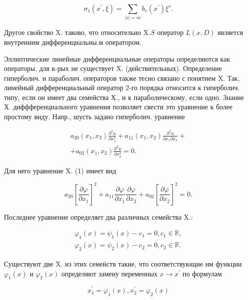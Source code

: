 \documentclass[10pt]{article}
\begin{document}
\[

\sigma_{1}\left(x^{\prime}, \xi\right)=\sum_{|v|=m} b_{v}\left(x^{\prime}\right) \xi^{v} .

\]



Другое свойство X. таково, что относительно $\mathrm{X} . S$ оператор $L(x, D)$ является внутренним дифференциальны.м оператором.



Эллиптические линейные дифференциальные операторы определяются как операторы, для к-рых не существует X. (действительных). Определение гиперболич. и параболич. операторов также тесно связано с понятием X. Так, линейный дифференциальный оператор 2-го порядка относится к гиперболич. типу, если он имеет два семейства Х., и к параболическому, если одно. Знание Х. диффференциального уравнения позволяет свести это уравнение к более простому виду. Напр., шусть задано гиперболич. уравнение



\[

\begin{gathered}

a_{20}\left(x_{1}, x_{2}\right) \frac{\partial^{2} u}{\partial x_{1}^{2}}+a_{11}\left(x_{1}, x_{2}\right) \frac{\partial^{2} u}{\partial x_{1} \partial x_{2}}+ \\

+a_{02}\left(x_{1}, x_{2}\right) \frac{\partial^{2} u}{\partial x_{2}^{2}}=0 .

\end{gathered}

\]



Для него уравнение X. (1) имеет вид



\[

a_{20}\left[\frac{\partial \varphi}{\partial x_{1}}\right]^{2}+a_{11} \frac{\partial \varphi}{\partial x_{1}} \frac{\partial \varphi}{\partial x_{2}}+a_{02}\left[\frac{\partial \varphi}{\partial x_{2}}\right]^{2}=0 .

\]



Последнее уравнение определяет два различных семейства X.:



\[

\begin{gathered}

\varphi_{1}(x)=\psi_{1}(x)-c_{1}=0, c_{1} \in \mathbb{R}, \\

\varphi_{2}(x)=\psi_{2}(x)-c_{2}=0, c_{2} \in \mathbb{R} .

\end{gathered}

\]



Существуют две $\mathrm{X}$. из этих семеӥств такие, что соответствующие им функции $\varphi_{1}(x)$ и $\varphi_{2}(x)$ определяют замену переменных $x \rightarrow x^{\prime}$ по формулам



\[

x_{1}^{\prime}=\varphi_{1}(x), x_{2}^{\prime}=\varphi_{2}(x)

\]
\end{document}
